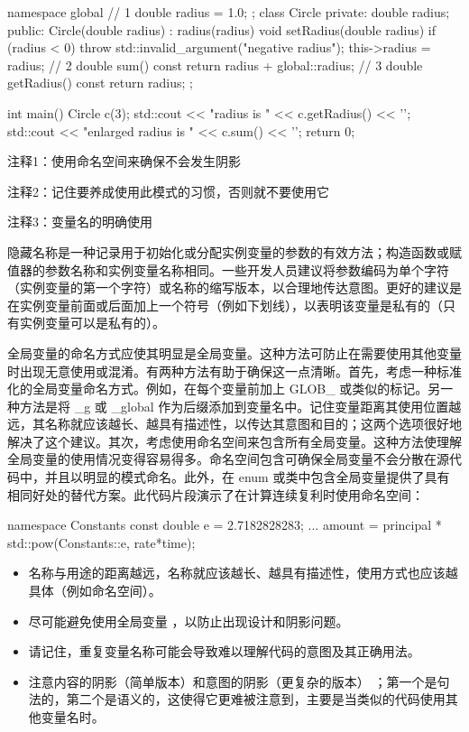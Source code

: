 \begin{cpp}
namespace global { // 1
  double radius = 1.0;
};
class Circle {
private:
  double radius;
public:
  Circle(double radius) : radius(radius) {}
  void setRadius(double radius) {
    if (radius < 0)
      throw std::invalid_argument("negative radius");
    this->radius = radius; // 2
  }
  double sum() const {
    return radius + global::radius; // 3
  }
  double getRadius() const { return radius; }
};

int main() {
  Circle c(3);
  std::cout << "radius is " << c.getRadius() << '\n';
  std::cout << "enlarged radius is " << c.sum() << '\n';
  return 0;
}
\end{cpp}

{\footnotesize
注释1：使用命名空间来确保不会发生阴影

注释2：记住要养成使用此模式的习惯，否则就不要使用它

注释3：变量名的明确使用
}

隐藏名称是一种记录用于初始化或分配实例变量的参数的有效方法；构造函数或赋值器的参数名称和实例变量名称相同。一些开发人员建议将参数编码为单个字符（实例变量的第一个字符）或名称的缩写版本，以合理地传达意图。更好的建议是在实例变量前面或后面加上一个符号（例如下划线），以表明该变量是私有的（只有实例变量可以是私有的）。

全局变量的命名方式应使其明显是全局变量。这种方法可防止在需要使用其他变量时出现无意使用或混淆。有两种方法有助于确保这一点清晰。首先，考虑一种标准化的全局变量命名方式。例如，在每个变量前加上 GLOB\_ 或类似的标记。另一种方法是将 \_g 或 \_global 作为后缀添加到变量名中。记住变量距离其使用位置越远，其名称就应该越长、越具有描述性，以传达其意图和目的；这两个选项很好地解决了这个建议。其次，考虑使用命名空间来包含所有全局变量。这种方法使理解全局变量的使用情况变得容易得多。命名空间包含可确保全局变量不会分散在源代码中，并且以明显的模式命名。此外，在 enum 或类中包含全局变量提供了具有相同好处的替代方案。此代码片段演示了在计算连续复利时使用命名空间：

\begin{cpp}
namespace Constants {
  const double e = 2.7182828283;
}
...
amount = principal * std::pow(Constants::e, rate*time);
\end{cpp}


\begin{itemize}
\item
名称与用途的距离越远，名称就应该越长、越具有描述性，使用方式也应该越具体（例如命名空间）。

\item
尽可能避免使用全局变量 ，以防止出现设计和阴影问题。

\item
请记住，重复变量名称可能会导致难以理解代码的意图及其正确用法。

\item
注意内容的阴影（简单版本）和意图的阴影（更复杂的版本） ；第一个是句法的，第二个是语义的，这使得它更难被注意到，主要是当类似的代码使用其他变量名时。
\end{itemize}
